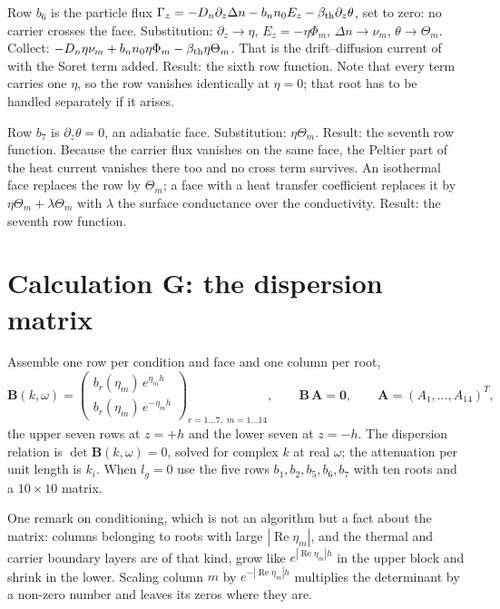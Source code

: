 \documentclass[11pt]{article}
\makeatletter
\newif\ifshowworked
\newenvironment{worked}{%
  \ifshowworked\par\smallskip\noindent\textit{Working.}\par\smallskip\else
  \setbox\z@\vbox\bgroup\fi}{\ifshowworked\par\smallskip\else\egroup\fi}
\makeatother
\begin{document}
\begin{worked}
Row $b_6$ is the particle flux
$\Gamma_z=-D_n\partial_z\Delta n-b_nn_0E_z-\beta_{\rm th}\partial_z\theta$, set to zero: no carrier
crosses the face. Substitution: $\partial_z\to\eta$, $E_z=-\eta\Phi_m$, $\Delta n\to\nu_m$,
$\theta\to\Theta_m$. Collect: $-D_n\eta\nu_m+b_nn_0\eta\Phi_m-\beta_{\rm th}\eta\Theta_m$. That is the
drift--diffusion current of \cite[Eqs.~(3), (7)]{YangZhou2005} with the Soret term added. Result: the
sixth row function. Note that every term carries one $\eta$, so the row vanishes identically at
$\eta=0$; that root has to be handled separately if it arises.
\end{worked}

\begin{worked}
Row $b_7$ is $\partial_z\theta=0$, an adiabatic face. Substitution: $\eta\Theta_m$. Result: the seventh
row function. Because the carrier flux vanishes on the same face, the Peltier part of the heat current
vanishes there too and no cross term survives. An isothermal face replaces the row by $\Theta_m$; a
face with a heat transfer coefficient replaces it by $\eta\Theta_m+\lambda\Theta_m$ with $\lambda$ the
surface conductance over the conductivity. Result: the seventh row function.
\end{worked}

\section{Calculation G: the dispersion matrix}\label{sec:calcG}

Assemble one row per condition and face and one column per root,
\begin{equation}
\mathbf B(k,\omega)=
\begin{pmatrix}
b_r(\eta_m)\,e^{\eta_mh}\\
b_r(\eta_m)\,e^{-\eta_mh}
\end{pmatrix}_{r=1\dots7,\;m=1\dots14},
\qquad \mathbf B\,\mathbf A=\mathbf 0,
\qquad \mathbf A=(A_1,\dots,A_{14})^{T},
\label{eq:Bmat}
\end{equation}
the upper seven rows at $z=+h$ and the lower seven at $z=-h$. The dispersion relation is
$\det\mathbf B(k,\omega)=0$, solved for complex $k$ at real $\omega$; the attenuation per unit length is
$k_i$. When $l_g=0$ use the five rows $b_1,b_2,b_5,b_6,b_7$ with ten roots and a $10\times10$ matrix.

One remark on conditioning, which is not an algorithm but a fact about the matrix: columns belonging to
roots with large $|\operatorname{Re}\eta_m|$, and the thermal and carrier boundary layers are of that kind,
grow like $e^{|\operatorname{Re}\eta_m|h}$ in the upper block and shrink in the lower. Scaling column $m$
by $e^{-|\operatorname{Re}\eta_m|h}$ multiplies the determinant by a non-zero number and leaves its zeros
where they are.
\end{document}

